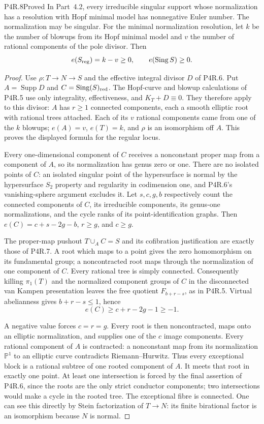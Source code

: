 \begin{statement}{P4R.8}{Proved}
In Part~4.2, every irreducible singular support
whose normalization has a resolution with Hopf
minimal model has nonnegative Euler number.
The normalization may be singular. For the
minimal normalization resolution, let $k$ be
the number of blowups from its Hopf minimal
model and $v$ the number of rational components
of the pole divisor. Then
\[
 e(S_{\rm reg})=k-v\ge0,\qquad
 e(\operatorname{Sing}S)\ge0.
\]
\end{statement}
\begin{proof}
Use $\rho:T\to N\to S$ and the effective
integral divisor $D$ of P4R.6. Put
$A=\operatorname{Supp}D$ and
$C=\operatorname{Sing}(S)_{\rm red}$.
The Hopf-curve and blowup calculations of
P4R.5 use only integrality, effectiveness,
and $K_T+D\equiv0$. They therefore apply
to this divisor: $A$ has $r\ge1$ connected
components, each a smooth elliptic root
with rational trees attached. Each of its
$v$ rational components came from one of
the $k$ blowups; $e(A)=v$, $e(T)=k$, and
$\rho$ is an isomorphism off $A$. This
proves the displayed formula for the
regular locus.

Every one-dimensional component of $C$
receives a nonconstant proper map from a
component of $A$, so its normalization
has genus zero or one. There are no
isolated points of $C$: an isolated
singular point of the hypersurface is
normal by the hypersurface $S_2$ property
and regularity in codimension one, and
P4R.6's vanishing-sphere argument excludes
it. Let $s,c,g,b$ respectively count the
connected components of $C$, its
irreducible components, its genus-one
normalizations, and the cycle ranks of
its point-identification graphs.
Then $e(C)=c+s-2g-b$, $r\ge g$, and
$c\ge g$.

The proper-map pushout $T\cup_A C=S$
and its cofibration justification are
exactly those of P4R.7. A root which
maps to a point gives the zero
homomorphism on its fundamental group;
a noncontracted root maps through the
normalization of one component of $C$.
Every rational tree is simply connected.
Consequently killing $\pi_1(T)$ and
the normalized component groups of $C$
in the disconnected van Kampen
presentation leaves the free quotient
$F_{b+r-s}$, as in P4R.5. Virtual
abelianness gives $b+r-s\le1$, hence
\[
 e(C)\ge c+r-2g-1\ge-1.
\]

A negative value forces $c=r=g$.
Every root is then noncontracted, maps
onto an elliptic normalization, and
supplies one of the $c$ image components.
Every rational component of $A$ is
contracted: a nonconstant map from its
normalization $\mathbb P^1$ to an
elliptic curve contradicts
Riemann--Hurwitz. Thus every exceptional
block is a rational subtree of one
rooted component of $A$. It meets that
root in exactly one point. At least one
intersection is forced by the final
assertion of P4R.6, since the roots are
the only strict conductor components;
two intersections would make a cycle
in the rooted tree. The exceptional
fibre is connected. One can see this
directly by Stein factorization of
$T\to N$: its finite birational factor
is an isomorphism because $N$ is normal.


\end{proof}
